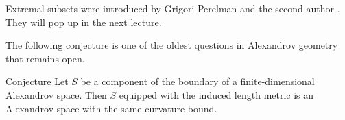 Extremal subsets were introduced by Grigori Perelman and the second author \cite{perelman-petrunin}.
They will pop up in the next lecture.

The following conjecture is one of the oldest questions in Alexandrov geometry that remains open.

\begin{thm}{Conjecture}
Let $S$ be a component of the boundary of a finite-dimensional Alexandrov space.
Then $S$ equipped with the induced length metric is an Alexandrov space with the same curvature bound.
\end{thm}


